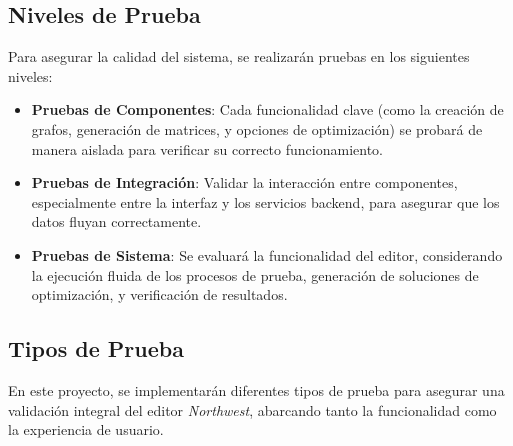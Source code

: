 \documentclass[stu, 12pt, letterpaper, donotrepeattitle, floatsintext, natbib]{apa7}
\begin{document}
\subsection{Niveles de Prueba}
Para asegurar la calidad del sistema, se realizarán pruebas en los siguientes niveles:
\begin{itemize}
    \item \textbf{Pruebas de Componentes}: Cada funcionalidad clave (como la creación de grafos, generación de matrices, y opciones de optimización) se probará de manera aislada para verificar su correcto funcionamiento.
    \item \textbf{Pruebas de Integración}: Validar la interacción entre componentes, especialmente entre la interfaz y los servicios backend, para asegurar que los datos fluyan correctamente.
    \item \textbf{Pruebas de Sistema}: Se evaluará la funcionalidad del editor, considerando la ejecución fluida de los procesos de prueba, generación de soluciones de optimización, y verificación de resultados.
\end{itemize}

\subsection{Tipos de Prueba}

\noindent En este proyecto, se implementarán diferentes tipos de prueba para asegurar una validación integral del editor \textit{Northwest}, abarcando tanto la funcionalidad como la experiencia de usuario.
\end{document}
